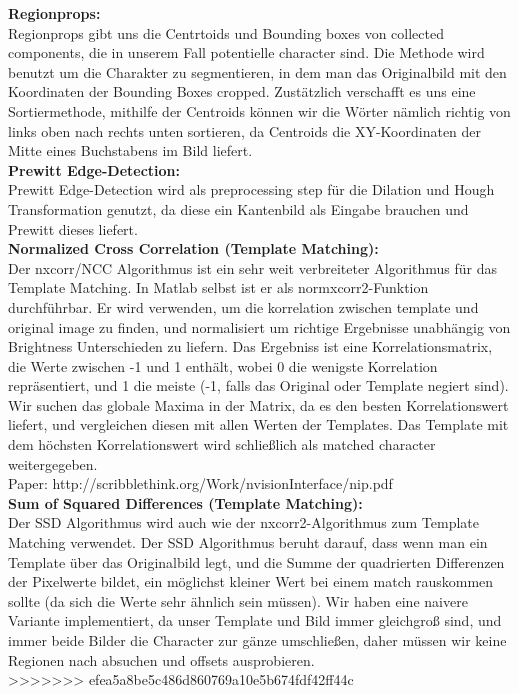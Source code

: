 \documentclass[paper=A4, deutsch]{scrartcl}
\begin{document}
\textbf{Regionprops:}\\
Regionprops gibt uns die Centrtoids und Bounding boxes von collected components, die in unserem Fall potentielle character sind. Die Methode wird benutzt um die Charakter zu segmentieren, in dem man das Originalbild mit den Koordinaten der Bounding Boxes cropped. Zustätzlich verschafft es uns eine Sortiermethode, mithilfe der Centroids können wir die Wörter nämlich richtig von links oben nach rechts unten sortieren,
da Centroids die XY-Koordinaten der Mitte eines Buchstabens im Bild liefert.\\

\textbf{Prewitt Edge-Detection:}\\
Prewitt Edge-Detection wird als preprocessing step für die Dilation und Hough Transformation genutzt, da diese ein Kantenbild als Eingabe brauchen und Prewitt dieses liefert.\\

\textbf{Normalized Cross Correlation (Template Matching):}\\
Der nxcorr/NCC Algorithmus ist ein sehr weit verbreiteter Algorithmus für das Template Matching. In Matlab selbst ist er als normxcorr2-Funktion durchführbar. 
Er wird verwenden, um die korrelation zwischen template und original image zu finden, und normalisiert um richtige Ergebnisse unabhängig von Brightness 
Unterschieden zu liefern. Das Ergebniss ist eine Korrelationsmatrix, die Werte zwischen -1 und 1 enthält, wobei 0 die wenigste Korrelation repräsentiert, 
und 1 die meiste (-1, falls das Original oder Template negiert sind). Wir suchen das globale Maxima in der Matrix, da es den besten Korrelationswert liefert, 
und vergleichen diesen mit allen Werten der Templates. Das Template mit dem höchsten Korrelationswert wird schließlich als matched character weitergegeben.\\

Paper: http://scribblethink.org/Work/nvisionInterface/nip.pdf\\

\textbf{Sum of Squared Differences (Template Matching):}\\
Der SSD Algorithmus wird auch wie der nxcorr2-Algorithmus zum Template Matching verwendet. Der SSD Algorithmus beruht darauf, dass wenn man ein Template 
über das Originalbild legt, und die Summe der quadrierten Differenzen der Pixelwerte bildet, ein möglichst kleiner Wert bei einem match rauskommen sollte (da 
sich die Werte sehr ähnlich sein müssen). Wir haben eine naivere Variante implementiert, da unser Template
und Bild immer gleichgroß sind, und immer beide Bilder die Character zur gänze umschließen, daher müssen wir keine Regionen nach absuchen und offsets ausprobieren.\\
>>>>>>> efea5a8be5c486d860769a10e5b674fdf42ff44c
\end{document}
